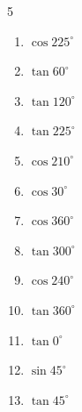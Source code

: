 \begin{multicols}{5}
\begin{enumerate}
  \item $\displaystyle \cos{225^\circ}$


  \item $\displaystyle \tan{60^\circ}$


  \item $\displaystyle \tan{120^\circ}$


  \item $\displaystyle \tan{225^\circ}$

        \phantom{$\displaystyle =1$}

  \item $\displaystyle \cos{210^\circ}$


  \item $\displaystyle \cos{30^\circ}$


  \item $\displaystyle \cos{360^\circ}$

        \phantom{$\displaystyle =1$}

  \item $\displaystyle \tan{300^\circ}$


  \item $\displaystyle \cos{240^\circ}$


  \item $\displaystyle \tan{360^\circ}$

        \phantom{$\displaystyle =0$}

  \item $\displaystyle \tan{0^\circ}$

        \phantom{$\displaystyle =0$}

  \item $\displaystyle \sin{45^\circ}$


  \item $\displaystyle \tan{45^\circ}$


\end{enumerate}
\end{multicols}
